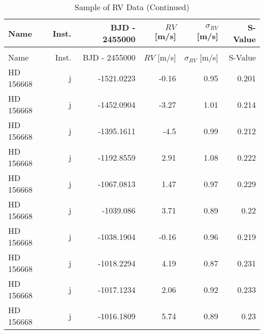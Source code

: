 \begin{longtable*}{lrrrrr}
\caption{Sample of RV Data} \\
\toprule
\midrule

Name & Inst. & BJD - 2455000 & $RV$ [m/s] & $\sigma_{RV}$ [m/s] & S-Value \\
\toprule
\endfirsthead
\caption[]{Sample of RV Data (Continued)} \\
\toprule
\midrule
Name & Inst. & BJD - 2455000 & $RV$ [m/s] & $\sigma_{RV}$ [m/s] & S-Value \\
\toprule
\endhead 
HD 156668 & j & -1521.0223 & -0.16 & 0.95 & 0.201 \\
HD 156668 & j & -1452.0904 & -3.27 & 1.01 & 0.214 \\
HD 156668 & j & -1395.1611 & -4.5 & 0.99 & 0.212 \\
HD 156668 & j & -1192.8559 & 2.91 & 1.08 & 0.222 \\
HD 156668 & j & -1067.0813 & 1.47 & 0.97 & 0.229 \\
HD 156668 & j & -1039.086 & 3.71 & 0.89 & 0.22 \\
HD 156668 & j & -1038.1904 & -0.16 & 0.96 & 0.219 \\
HD 156668 & j & -1018.2294 & 4.19 & 0.87 & 0.231 \\
HD 156668 & j & -1017.1234 & 2.06 & 0.92 & 0.233 \\
HD 156668 & j & -1016.1809 & 5.74 & 0.89 & 0.23 \\
\bottomrule
\end{longtable*}
